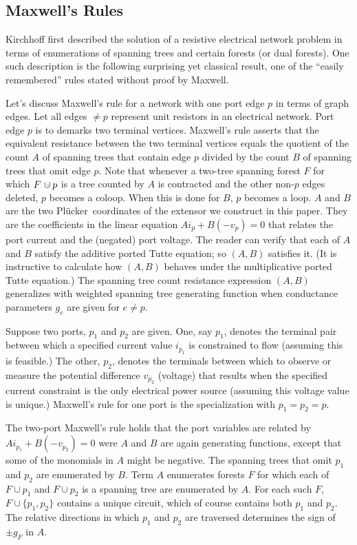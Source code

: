 \documentclass[12pt]{article}
\theoremstyle{definition}
\newcommand{\dunion}
{\mbox{\hbox{\hskip6pt$\cdot$\hskip-5.50pt$\cup$\hskip2pt}}}
\newcommand{\Plucker}{Pl\"{u}cker\ }
\begin{document}
\subsection{Maxwell's Rules}
\label{MaxwellSection}




Kirchhoff\cite{Kirchhoff} first described the solution of a resistive electrical
network problem in terms of enumerations of spanning trees
and certain forests (or dual forests).  One such description
is the following surprising yet
classical result, one of the ``easily remembered''
rules stated without proof by Maxwell\cite{MaxR}.

Let's discuss Maxwell's rule for a network with
one port edge $p$ in terms of graph edges.
Let all edges $\neq p$ represent unit resistors in an
electrical network.  Port edge $p$ is to 
demarks two terminal vertices.  Maxwell's rule asserts 
that the equivalent resistance between the two terminal vertices 
equals the quotient of the count $A$ of spanning trees that
contain edge $p$ divided by the count $B$ of spanning trees 
that omit edge $p$.  Note that whenever a two-tree spanning forest $F$ 
for which $F\dunion p$ is a tree counted by $A$ is contracted and the 
other non-$p$ edges deleted,
$p$ becomes a coloop.  When this is done for $B$, $p$ becomes
a loop.  $A$ and $B$ are 
the two \Plucker coordinates of the extensor we construct in this 
paper.  They are the coefficients in the linear equation 
$Ai_p + B(-v_p) = 0$ that relates
the port current and the (negated) port voltage.  
The reader can verify that each of $A$ and $B$ satisfy 
the additive ported Tutte equation;
so $(A,B)$ satisfies it.  
(It is instructive to calculate how $(A,B)$ behaves under the 
multiplicative ported Tutte equation.)  The spanning tree count
resistance expression $(A,B)$ generalizes with weighted spanning 
tree generating function when conductance parameters $g_e$ are given
for $e\neq p$.

Suppose  two ports, $p_1$ and $p_2$ are given.  
One, say $p_1$, denotes the terminal pair
between which a specified current value $i_{p_1}$ is constrained to
flow (assuming this is feasible.)  The other, $p_2$, denotes the terminals
between which to observe or measure the potential difference 
$v_{p_2}$ (voltage)
that results when the specified current constraint is the only 
electrical power source (assuming this voltage value is unique.)
Maxwell's rule for one port is the specialization with $p_1=p_2=p$.


The two-port Maxwell's rule holds that the port variables are related
by $Ai_{p_1} + B(-v_{p_2})=0$ were $A$ and $B$ are again generating
functions, except that some of the monomials in $A$ might be negative.
The spanning trees that omit $p_1$ and $p_2$ are enumerated by $B$.
Term $A$ enumerates forests $F$ for which each of $F\cup p_1$ and 
$F\cup p_2$ is a spanning tree are enumerated by $A$.  For each such
$F$, $F\cup\{p_1, p_2\}$ contains a unique circuit, which of course
contains both $p_1$ and $p_2$.  The relative 
directions in which $p_1$ and $p_2$ are traversed determines the
sign of $\pm g_F$ in $A$.  
\end{document}
